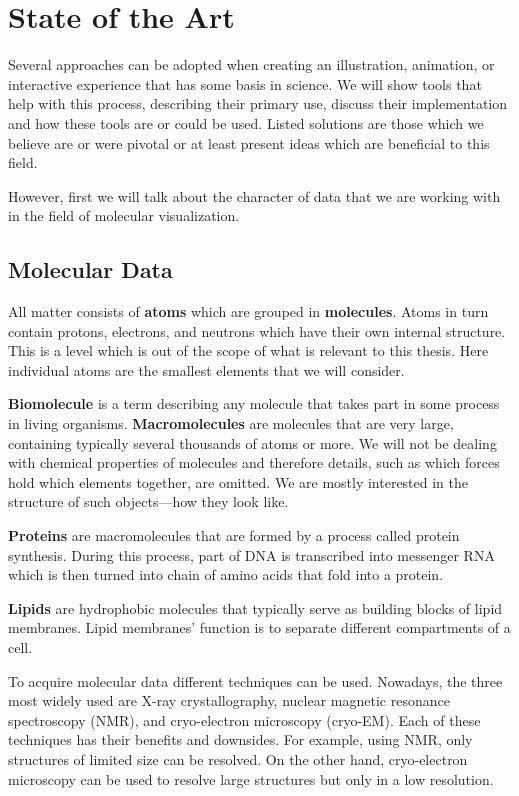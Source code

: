 \documentclass[
  digital, %
  table,   %
  nolof,     %
  nolot,     %
  oneside,
]{fithesis3}
\begin{document}
\chapter{State of the Art}
\label{chap:star}
Several approaches can be adopted when creating an illustration, animation, or interactive experience that has some basis in science. We will show tools that help with this process, describing their primary use, discuss their implementation and how these tools are or could be used. Listed solutions are those which we believe are or were pivotal or at least present ideas which are beneficial to this field.

However, first we will talk about the character of data that we are working with in the field of molecular visualization.

\section{Molecular Data}
All matter consists of \textbf{atoms} which are grouped in \textbf{molecules}. Atoms in turn contain protons, electrons, and neutrons which have their own internal structure. This is a level which is out of the scope of what is relevant to this thesis. Here individual atoms are the smallest elements that we will consider.

\textbf{Biomolecule} is a term describing any molecule that takes part in some process in living organisms. \textbf{Macromolecules} are molecules that are very large, containing typically several thousands of atoms or more. We will not be dealing with chemical properties of molecules and therefore details, such as which forces hold which elements together, are omitted. We are mostly interested in the structure of such objects—how they look like.

\textbf{Proteins} are macromolecules that are formed by a process called protein synthesis. During this process, part of DNA is transcribed into messenger RNA which is then turned into chain of amino acids that fold into a protein.

\textbf{Lipids} are hydrophobic molecules that typically serve as building blocks of lipid membranes. Lipid membranes' function is to separate different compartments of a cell.

To acquire molecular data different techniques can be used. Nowadays, the three most widely used are X-ray crystallography, nuclear magnetic resonance spectroscopy (NMR), and cryo-electron microscopy (cryo-EM). Each of these techniques has their benefits and downsides. For example, using NMR, only structures of limited size can be resolved. On the other hand, cryo-electron microscopy can be used to resolve large structures but only in a low resolution.
\end{document}
